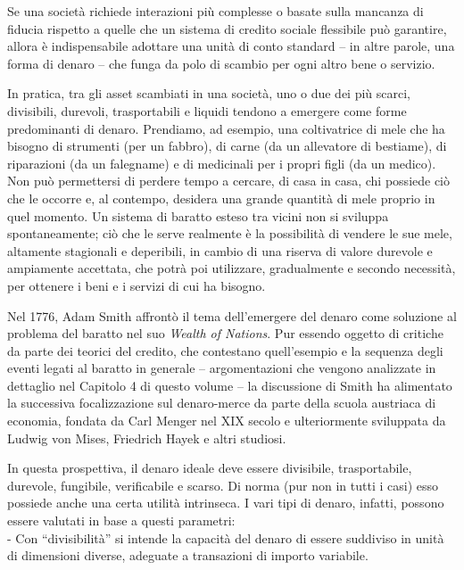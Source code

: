 \documentclass[
  a5paper,
  smalldemyvopaper,10pt,twoside,onecolumn,openright,extrafontsizes,hidelinks]{memoir}
\begin{document}
Se una società richiede interazioni più complesse o basate sulla
mancanza di fiducia rispetto a quelle che un sistema di credito sociale
flessibile può garantire, allora è indispensabile adottare una unità di
conto standard -- in altre parole, una forma di denaro -- che funga da
polo di scambio per ogni altro bene o servizio.

In pratica, tra gli asset scambiati in una società, uno o due dei più
scarci, divisibili, durevoli, trasportabili e liquidi tendono a emergere
come forme predominanti di denaro. Prendiamo, ad esempio, una
coltivatrice di mele che ha bisogno di strumenti (per un fabbro), di
carne (da un allevatore di bestiame), di riparazioni (da un falegname) e
di medicinali per i propri figli (da un medico). Non può permettersi di
perdere tempo a cercare, di casa in casa, chi possiede ciò che le
occorre e, al contempo, desidera una grande quantità di mele proprio in
quel momento. Un sistema di baratto esteso tra vicini non si sviluppa
spontaneamente; ciò che le serve realmente è la possibilità di vendere
le sue mele, altamente stagionali e deperibili, in cambio di una riserva
di valore durevole e ampiamente accettata, che potrà poi utilizzare,
gradualmente e secondo necessità, per ottenere i beni e i servizi di cui
ha bisogno.

Nel 1776, Adam Smith affrontò il tema dell'emergere del denaro come
soluzione al problema del baratto nel suo \emph{Wealth of Nations}. Pur
essendo oggetto di critiche da parte dei teorici del credito, che
contestano quell'esempio e la sequenza degli eventi legati al baratto in
generale -- argomentazioni che vengono analizzate in dettaglio nel
Capitolo 4 di questo volume -- la discussione di Smith ha alimentato la
successiva focalizzazione sul denaro-merce da parte della scuola
austriaca di economia, fondata da Carl Menger nel XIX secolo e
ulteriormente sviluppata da Ludwig von Mises, Friedrich Hayek e altri
studiosi.

In questa prospettiva, il denaro ideale deve essere divisibile,
trasportabile, durevole, fungibile, verificabile e scarso. Di norma (pur
non in tutti i casi) esso possiede anche una certa utilità intrinseca. I
vari tipi di denaro, infatti, possono essere valutati in base a questi
parametri:\\
- Con ``divisibilità'' si intende la capacità del denaro di essere
suddiviso in unità di dimensioni diverse, adeguate a transazioni di
importo variabile.
\end{document}
